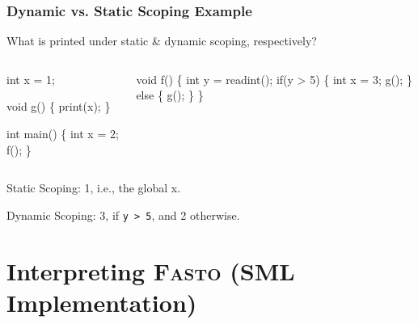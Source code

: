 \documentclass{beamer}
\renewcommand{\emph}[1]{\textcolor{structure}{#1}}
\newcommand{\emp}[1]{\textcolor{DikuRed}{ #1}}
\begin{document}
\begin{frame}[fragile, t]
\frametitle{Dynamic vs. Static Scoping Example}

\begin{block}{What is printed under static \& dynamic scoping, respectively? }
\begin{columns}
\vspace{-2ex}
\begin{colorcode}[fontsize=\scriptsize]
\emph{int x = 1;}

void g() \{ print(x); \}

int main() \{ \emp{int x = 2;} f(); \}
\end{colorcode} 
\vspace{-2ex}
\begin{colorcode}[fontsize=\scriptsize]
void f() \{
    int y = readint();
    if(y > 5) \{ \alert{int x = 3; g();} \}
    else      \{ \emp{g();}                    \}
\}
\end{colorcode}
\end{columns}
\end{block}


\pause
\bigskip

Static Scoping: \emph{1}, i.e., \emph{the global x}.

\smallskip

Dynamic Scoping: \alert{3}, if {\tt y > 5}, and \emp{2} otherwise.
\end{frame}


\section{Interpreting \textsc{Fasto} (SML Implementation)}

\begin{frame}[fragile]
	\tableofcontents[currentsection]
\end{frame}
\end{document}
